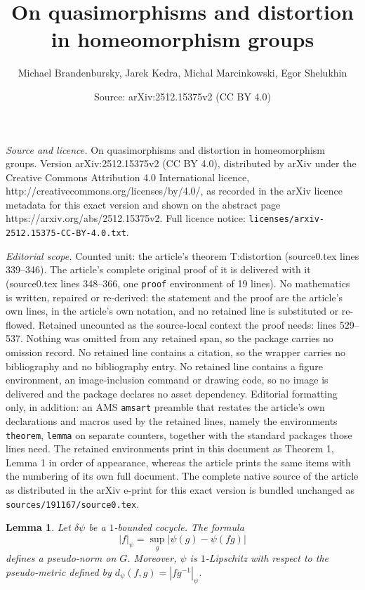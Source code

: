 \documentclass[10pt,a4paper]{amsart}
\title{On quasimorphisms and distortion in homeomorphism groups}
\author{Michael Brandenbursky, Jarek Kedra, Michal Marcinkowski, Egor Shelukhin}
\date{Source: arXiv:2512.15375v2 (CC BY 4.0)}
\newtheorem{lemma}{Lemma}
\begin{document}
\maketitle

\noindent\emph{Source and licence.} On quasimorphisms and distortion in homeomorphism groups. Version arXiv:2512.15375v2 (CC BY 4.0), distributed by arXiv under the Creative Commons Attribution 4.0 International licence, http://creativecommons.org/licenses/by/4.0/, as recorded in the arXiv licence metadata for this exact version and shown on the abstract page https://arxiv.org/abs/2512.15375v2. Full licence notice: \texttt{licenses/arxiv-2512.15375-CC-BY-4.0.txt}.\par\smallskip

\noindent\textit{Editorial scope.} Counted unit: the article's theorem T:distortion (source0.tex lines 339--346). The article's complete original proof of it is delivered with it (source0.tex lines 348--366, one \texttt{proof} environment of 19 lines). No mathematics is written, repaired or re-derived: the statement and the proof are the article's own lines, in the article's own notation, and no retained line is substituted or re-flowed.  Retained uncounted as the source-local context the proof needs: lines 529--537.  Nothing was omitted from any retained span, so the package carries no omission record.  No retained line contains a citation, so the wrapper carries no bibliography and no bibliography entry.  No retained line contains a figure environment, an image-inclusion command or drawing code, so no image is delivered and the package declares no asset dependency.  Editorial formatting only, in addition: an AMS \texttt{amsart} preamble that restates the article's own declarations and macros used by the retained lines, namely the environments \texttt{theorem}, \texttt{lemma} on separate counters, together with the standard packages those lines need.  The retained environments print in this document as Theorem 1, Lemma 1 in order of appearance, whereas the article prints the same items with the numbering of its own full document.  The complete native source of the article as distributed in the arXiv e-print for this exact version is bundled unchanged as \texttt{sources/191167/source0.tex}.
\begin{lemma}\label{L:psi-norm}
Let $\delta\psi$ be a $1$-bounded cocycle.
The formula
$$
|f|_{\psi} = \sup_g|\psi(g)-\psi(fg)|
$$
defines a pseudo-norm on $G$. Moreover, $\psi$ is $1$-Lipschitz with
respect to the pseudo-metric defined by $d_{\psi}(f,g) = |fg^{-1}|_{\psi}$.
\end{lemma}
\end{document}
